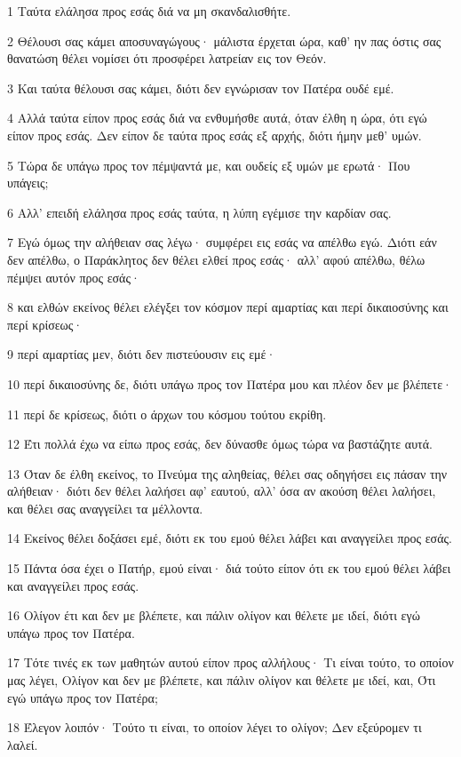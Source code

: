 \par 1 Ταύτα ελάλησα προς εσάς διά να μη σκανδαλισθήτε.
\par 2 Θέλουσι σας κάμει αποσυναγώγους· μάλιστα έρχεται ώρα, καθ' ην πας όστις σας θανατώση θέλει νομίσει ότι προσφέρει λατρείαν εις τον Θεόν.
\par 3 Και ταύτα θέλουσι σας κάμει, διότι δεν εγνώρισαν τον Πατέρα ουδέ εμέ.
\par 4 Αλλά ταύτα είπον προς εσάς διά να ενθυμήσθε αυτά, όταν έλθη η ώρα, ότι εγώ είπον προς εσάς. Δεν είπον δε ταύτα προς εσάς εξ αρχής, διότι ήμην μεθ' υμών.
\par 5 Τώρα δε υπάγω προς τον πέμψαντά με, και ουδείς εξ υμών με ερωτά· Που υπάγεις;
\par 6 Αλλ' επειδή ελάλησα προς εσάς ταύτα, η λύπη εγέμισε την καρδίαν σας.
\par 7 Εγώ όμως την αλήθειαν σας λέγω· συμφέρει εις εσάς να απέλθω εγώ. Διότι εάν δεν απέλθω, ο Παράκλητος δεν θέλει ελθεί προς εσάς· αλλ' αφού απέλθω, θέλω πέμψει αυτόν προς εσάς·
\par 8 και ελθών εκείνος θέλει ελέγξει τον κόσμον περί αμαρτίας και περί δικαιοσύνης και περί κρίσεως·
\par 9 περί αμαρτίας μεν, διότι δεν πιστεύουσιν εις εμέ·
\par 10 περί δικαιοσύνης δε, διότι υπάγω προς τον Πατέρα μου και πλέον δεν με βλέπετε·
\par 11 περί δε κρίσεως, διότι ο άρχων του κόσμου τούτου εκρίθη.
\par 12 Έτι πολλά έχω να είπω προς εσάς, δεν δύνασθε όμως τώρα να βαστάζητε αυτά.
\par 13 Όταν δε έλθη εκείνος, το Πνεύμα της αληθείας, θέλει σας οδηγήσει εις πάσαν την αλήθειαν· διότι δεν θέλει λαλήσει αφ' εαυτού, αλλ' όσα αν ακούση θέλει λαλήσει, και θέλει σας αναγγείλει τα μέλλοντα.
\par 14 Εκείνος θέλει δοξάσει εμέ, διότι εκ του εμού θέλει λάβει και αναγγείλει προς εσάς.
\par 15 Πάντα όσα έχει ο Πατήρ, εμού είναι· διά τούτο είπον ότι εκ του εμού θέλει λάβει και αναγγείλει προς εσάς.
\par 16 Ολίγον έτι και δεν με βλέπετε, και πάλιν ολίγον και θέλετε με ιδεί, διότι εγώ υπάγω προς τον Πατέρα.
\par 17 Τότε τινές εκ των μαθητών αυτού είπον προς αλλήλους· Τι είναι τούτο, το οποίον μας λέγει, Ολίγον και δεν με βλέπετε, και πάλιν ολίγον και θέλετε με ιδεί, και, Ότι εγώ υπάγω προς τον Πατέρα;
\par 18 Έλεγον λοιπόν· Τούτο τι είναι, το οποίον λέγει το ολίγον; Δεν εξεύρομεν τι λαλεί.
